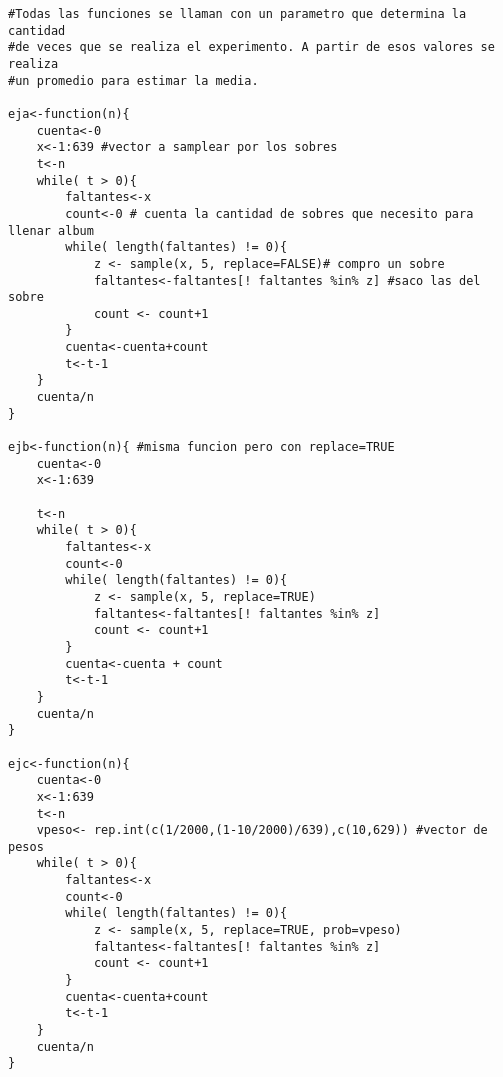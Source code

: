 \documentclass[a4paper,10pt]{article}
\begin{document}


\begin{lstlisting}
#Todas las funciones se llaman con un parametro que determina la cantidad 
#de veces que se realiza el experimento. A partir de esos valores se realiza
#un promedio para estimar la media.

eja<-function(n){ 
	cuenta<-0
	x<-1:639 #vector a samplear por los sobres
	t<-n
	while( t > 0){
		faltantes<-x
		count<-0 # cuenta la cantidad de sobres que necesito para llenar album 
		while( length(faltantes) != 0){
			z <- sample(x, 5, replace=FALSE)# compro un sobre
			faltantes<-faltantes[! faltantes %in% z] #saco las del sobre
			count <- count+1 
		}
		cuenta<-cuenta+count
		t<-t-1
	}
	cuenta/n
}

ejb<-function(n){ #misma funcion pero con replace=TRUE
	cuenta<-0
	x<-1:639
	
	t<-n
	while( t > 0){
		faltantes<-x
		count<-0
		while( length(faltantes) != 0){
			z <- sample(x, 5, replace=TRUE)
			faltantes<-faltantes[! faltantes %in% z]
			count <- count+1
		}
		cuenta<-cuenta + count
		t<-t-1
	}
	cuenta/n
}

ejc<-function(n){
	cuenta<-0
	x<-1:639
	t<-n
	vpeso<- rep.int(c(1/2000,(1-10/2000)/639),c(10,629)) #vector de pesos
	while( t > 0){
		faltantes<-x
		count<-0
		while( length(faltantes) != 0){
			z <- sample(x, 5, replace=TRUE, prob=vpeso) 
			faltantes<-faltantes[! faltantes %in% z]
			count <- count+1
		}
		cuenta<-cuenta+count
		t<-t-1
	}
	cuenta/n
}



\end{lstlisting}
\end{document}
